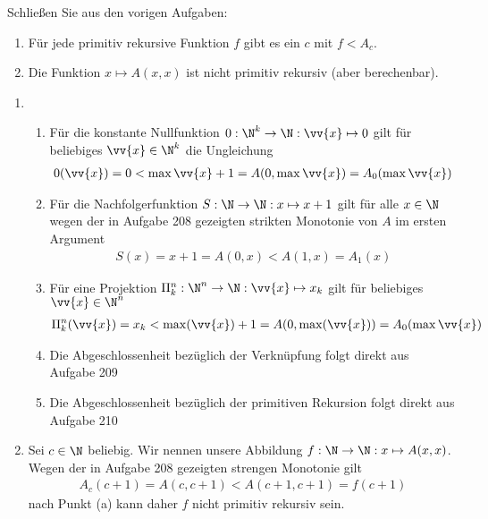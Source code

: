 
\begin{exercise}[211]

Schließen Sie aus den vorigen Aufgaben:
\begin{enumerate}[label = \alph*.]
  \item Für jede primitiv rekursive Funktion $f$ gibt es ein $c$ mit $f < A_c$.
  \item Die Funktion $x \mapsto A(x,x)$ ist nicht primitiv rekursiv (aber berechenbar).
\end{enumerate}

\end{exercise}


\begin{solution}
	\phantom{}
	\begin{enumerate}[label = \alph*.]
		\item
			\begin{enumerate}[label = \arabic*.]
				\item Für die konstante Nullfunktion $0: \N^k \to \N: \vv{x} \mapsto 0$
        gilt für beliebiges $\vv{x} \in \N^k$ die Ungleichung
					\begin{align*}
					0(\vv{x}) = 0 < \max \vv{x} + 1 = A(0, \max \vv{x}) = A_0(\max \vv{x})
					\end{align*}

				\item Für die Nachfolgerfunktion $S: \N \to \N: x \mapsto x + 1$ gilt für alle $x \in \N$ wegen der in Aufgabe 208 gezeigten strikten Monotonie von $A$ im ersten Argument
					\begin{align*}
					S(x) = x + 1 = A(0, x) < A(1, x) = A_1(x)
					\end{align*}

				\item Für eine Projektion $\Pi_k^n: \N^n \to \N: \vv{x} \mapsto x_k$
        gilt für beliebiges $\vv{x} \in \N^n$
				\begin{align*}
				\Pi_k^n(\vv{x}) = x_k < \max(\vv{x}) + 1 = A(0, \max(\vv{x})) = A_0(\max \vv{x})
				\end{align*}

				\item Die Abgeschlossenheit bezüglich der Verknüpfung folgt direkt aus Aufgabe 209

				\item Die Abgeschlossenheit bezüglich der primitiven Rekursion folgt direkt aus Aufgabe 210
			\end{enumerate}
		\item Sei $c \in \N$ beliebig. Wir nennen unsere Abbildung $f: \N \to \N: x \mapsto A(x,x)$. Wegen der in Aufgabe 208 gezeigten strengen Monotonie gilt
		\begin{align*}
		A_c(c + 1) = A(c, c + 1) < A(c + 1, c + 1) = f(c + 1)
		\end{align*}
		nach Punkt (a) kann daher $f$ nicht primitiv rekursiv sein.
	\end{enumerate}

\end{solution}
